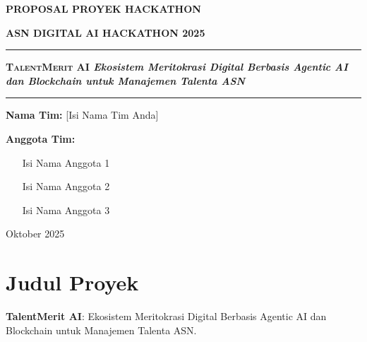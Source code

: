 \documentclass[11pt, a4paper]{article}
\begin{document}
\begin{titlepage}
    \centering
    \vspace*{1cm}
    
    \Huge\bfseries
    PROPOSAL PROYEK HACKATHON
    
    \vspace{0.5cm}
    
    \huge\bfseries
    ASN DIGITAL AI HACKATHON 2025
    
    \vspace{2cm}
    
    \rule{\linewidth}{1.5pt}
    \vspace{0.4cm}
    \Huge\bfseries\textsc{TalentMerit AI}
    \vspace{0.4cm}
    \large\textit{Ekosistem Meritokrasi Digital Berbasis Agentic AI dan Blockchain untuk Manajemen Talenta ASN}
    \vspace{0.4cm}
    \rule{\linewidth}{1.5pt}
    
    \vspace{3cm}
    
    \large
    \textbf{Nama Tim:} [Isi Nama Tim Anda]
    
    \vspace{0.5cm}
    
    \textbf{Anggota Tim:}
    \begin{itemize}
        \item [Isi Nama Anggota 1]
        \item [Isi Nama Anggota 2]
        \item [Isi Nama Anggota 3]
    \end{itemize}
    
    \vfill
    
    \large
    Oktober 2025
    
\end{titlepage}

\tableofcontents
\newpage

\section{Judul Proyek}
\textbf{TalentMerit AI}: Ekosistem Meritokrasi Digital Berbasis Agentic AI dan Blockchain untuk Manajemen Talenta ASN.
\end{document}
